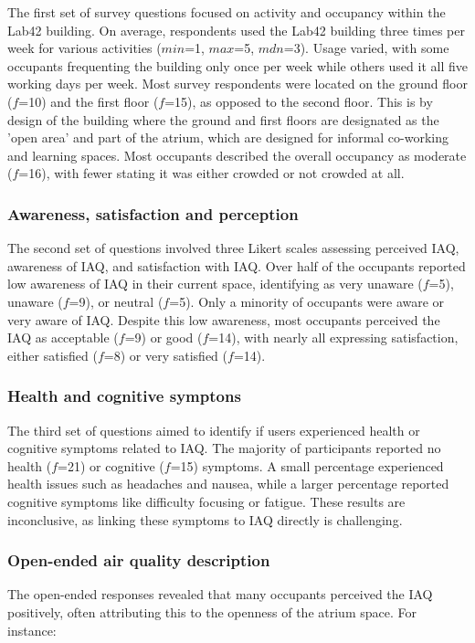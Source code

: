 The first set of survey questions focused on activity and occupancy within the Lab42 building. On average, respondents used the Lab42 building three times per week for various activities ($min$=1, $max$=5, $mdn$=3). Usage varied, with some occupants frequenting the building only once per week while others used it all five working days per week. Most survey respondents were located on the ground floor ($f$=10) and the first floor ($f$=15), as opposed to the second floor. This is by design of the building where the ground and first floors are designated as the 'open area' and part of the atrium, which are designed for informal co-working and learning spaces. Most occupants described the overall occupancy as moderate ($f$=16), with fewer stating it was either crowded or not crowded at all.

\subsubsection{Awareness, satisfaction and perception}

The second set of questions involved three Likert scales assessing perceived IAQ, awareness of IAQ, and satisfaction with IAQ. Over half of the occupants reported low awareness of IAQ in their current space, identifying as very unaware ($f$=5), unaware ($f$=9), or neutral ($f$=5). Only a minority of occupants were aware or very aware of IAQ. Despite this low awareness, most occupants perceived the IAQ as acceptable ($f$=9) or good ($f$=14), with nearly all expressing satisfaction, either satisfied ($f$=8) or very satisfied ($f$=14).


\subsubsection{Health and cognitive symptons}

The third set of questions aimed to identify if users experienced health or cognitive symptoms related to IAQ. The majority of participants reported no health ($f$=21) or cognitive ($f$=15) symptoms. A small percentage experienced health issues such as headaches and nausea, while a larger percentage reported cognitive symptoms like difficulty focusing or fatigue. These results are inconclusive, as linking these symptoms to IAQ directly is challenging.

\subsubsection{Open-ended air quality description}
The open-ended responses revealed that many occupants perceived the IAQ positively, often attributing this to the openness of the atrium space. For instance:

